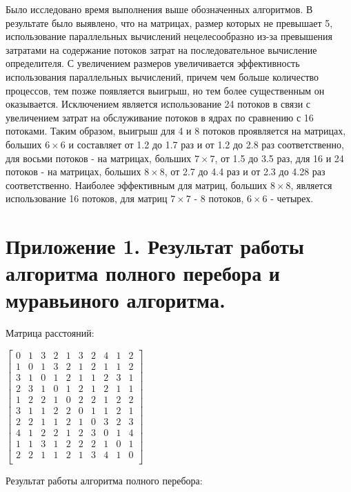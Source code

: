 \documentclass[a4paper,oneside,14pt]{extreport}
\begin{document}
Было исследовано время выполнения выше обозначенных алгоритмов. В результате было выявлено, что на матрицах, размер которых не превышает 5, использование параллельных вычислений нецелесообразно из-за превышения затратами на содержание потоков затрат на последовательное вычисление определителя. С увеличением размеров увеличивается эффективность использования параллельных вычислений, причем чем больше количество процессов, тем позже появляется выигрыш, но тем более существенным он оказывается. Исключением является использование 24 потоков в связи с увеличением затрат на обслуживание потоков в ядрах по сравнению с 16 потоками. Таким образом, выигрыш для 4 и 8 потоков проявляется на матрицах, больших $6\times6$ и составляет от 1.2 до 1.7 раз и от 1.2 до 2.8 раз соответственно, для восьми потоков - на матрицах, больших $7\times7$, от 1.5 до 3.5 раз, для 16 и 24 потоков - на матрицах, больших $8\times8$, от  2.7 до 4.4 раз и от 2.3 до 4.28 раз соответственно. Наиболее эффективным для матриц, больших $8\times8$, является использование 16 потоков, для матриц $7\times7$ - 8 потоков, $6\times6$ - четырех.

\newpage
{}



\nocite{*}

\newpage
\section*{Приложение 1. Результат работы алгоритма полного перебора и муравьиного алгоритма.}

Матрица расстояний:

$\begin{bmatrix} 
0&1&3&2&1&3&2&4&1&2 \\
1&0&1&3&2&1&2&1&1&2 \\
3&1&0&1&2&1&1&2&3&1 \\
2&3&1&0&1&2&1&2&1&1 \\
1&2&2&1&0&2&2&1&2&2 \\
3&1&1&2&2&0&1&1&2&1 \\
2&2&1&1&2&1&0&3&2&3 \\
4&1&2&2&1&2&3&0&1&4 \\
1&1&3&1&2&2&2&1&0&1 \\
2&2&1&1&2&1&3&4&1&0 \\

\end{bmatrix}$ 

Результат работы алгоритма полного перебора:
\end{document}
